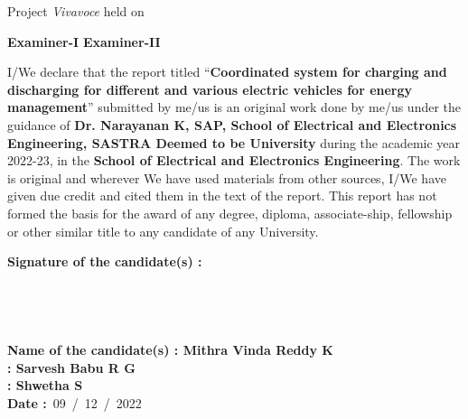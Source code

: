 \documentclass[a4paper, 12pt, oneside]{sastra}
\begin{document}
	\noindent Project \textit{Vivavoce} held on
	
	\vspace*{0.50in}
	\noindent \textbf{Examiner-I} \hspace*{120mm} \textbf{Examiner-II}
	
	
	\declaration
	
		
		\begin{doublespace}
		\linespread{2}
		
		I/We declare that the report titled ``\textbf{Coordinated system for charging and discharging for different and various electric vehicles for energy management}'' submitted by me/us is an original work done by me/us under the guidance of \textbf{Dr. Narayanan K, SAP, School of Electrical and Electronics Engineering, SASTRA Deemed to be University} during the academic year 2022-23, in the \textbf{School of Electrical and Electronics Engineering}. The work is original and wherever We have used materials from other sources, I/We have given due credit and cited them in the text of the report. This report has not formed the basis for the award of any degree, diploma, associate-ship, fellowship or other similar title to any candidate of any University.\\
		
	\end{doublespace}
	\noindent \textbf{Signature of the candidate(s)	:}	
	\\
	\\
	\\
	\\
	\\
	\noindent\textbf{Name of the candidate(s)\hspace{7mm}		: Mithra Vinda Reddy K}\\
	\hspace*{53mm}\textbf{: Sarvesh Babu R G}\\
	\hspace*{53mm}\textbf{: Shwetha S}\\
	\noindent\textbf{Date\hspace*{43.5mm}					:}~09~/~12~/~2022\\%
	
	\acknowledgements
	
\end{document}
